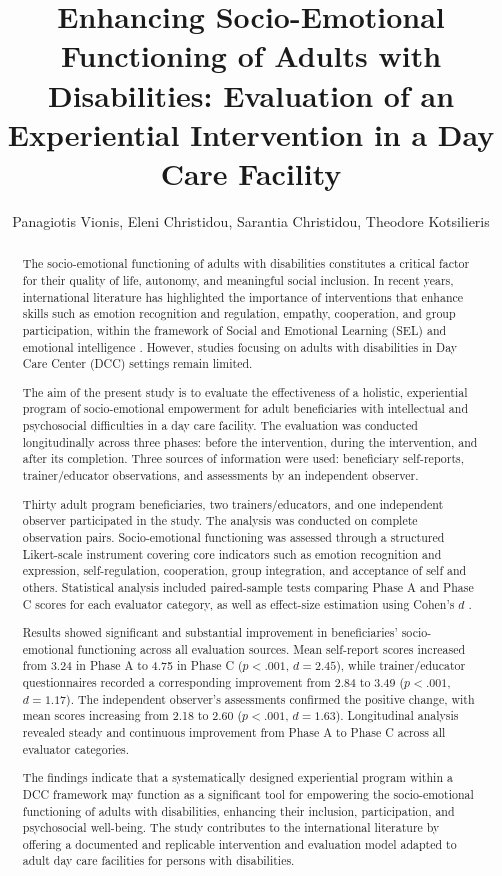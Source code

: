 \documentclass[journal]{IEEEtran}
\title{Enhancing Socio-Emotional Functioning of Adults with Disabilities: Evaluation of an Experiential Intervention in a Day Care Facility}
\author{
Panagiotis Vionis,
Eleni Christidou,
Sarantia Christidou,
Theodore Kotsilieris
}
\begin{document}
\maketitle

\begin{abstract}
The socio-emotional functioning of adults with disabilities constitutes a critical factor for their quality of life, autonomy, and meaningful social inclusion. In recent years, international literature has highlighted the importance of interventions that enhance skills such as emotion recognition and regulation, empathy, cooperation, and group participation, within the framework of Social and Emotional Learning (SEL) and emotional intelligence \cite{goleman1995,casel2020,durlak2011}. However, studies focusing on adults with disabilities in Day Care Center (DCC) settings remain limited.

The aim of the present study is to evaluate the effectiveness of a holistic, experiential program of socio-emotional empowerment for adult beneficiaries with intellectual and psychosocial difficulties in a day care facility. The evaluation was conducted longitudinally across three phases: before the intervention, during the intervention, and after its completion. Three sources of information were used: beneficiary self-reports, trainer/educator observations, and assessments by an independent observer.

Thirty adult program beneficiaries, two trainers/educators, and one independent observer participated in the study. The analysis was conducted on complete observation pairs. Socio-emotional functioning was assessed through a structured Likert-scale instrument covering core indicators such as emotion recognition and expression, self-regulation, cooperation, group integration, and acceptance of self and others. Statistical analysis included paired-sample tests \cite{student1908} comparing Phase A and Phase C scores for each evaluator category, as well as effect-size estimation using Cohen's $d$ \cite{cohen1988}.

Results showed significant and substantial improvement in beneficiaries' socio-emotional functioning across all evaluation sources. Mean self-report scores increased from 3.24 in Phase A to 4.75 in Phase C ($p < .001$, $d = 2.45$), while trainer/educator questionnaires recorded a corresponding improvement from 2.84 to 3.49 ($p < .001$, $d = 1.17$). The independent observer's assessments confirmed the positive change, with mean scores increasing from 2.18 to 2.60 ($p < .001$, $d = 1.63$). Longitudinal analysis revealed steady and continuous improvement from Phase A to Phase C across all evaluator categories.

The findings indicate that a systematically designed experiential program within a DCC framework may function as a significant tool for empowering the socio-emotional functioning of adults with disabilities, enhancing their inclusion, participation, and psychosocial well-being. The study contributes to the international literature by offering a documented and replicable intervention and evaluation model adapted to adult day care facilities for persons with disabilities.
\end{abstract}
\end{document}
